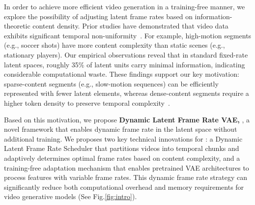 In order to achieve more efficient video generation in a training-free manner, we explore the possibility of adjusting latent frame rates based on information-theoretic content density.
Prior studies have demonstrated that video data exhibits significant temporal non-uniformity~\cite{feichtenhofer2019slowfast,yang2020temporal,li2022nuta}. For example, high-motion segments (e.g., soccer shots) have more content complexity than static scenes (e.g., stationary players). 
Our empirical observations reveal that in standard fixed-rate latent spaces, roughly 35\% of latent units carry minimal information, indicating considerable computational waste. 
These findings support our key motivation: sparse-content segments (e.g., slow-motion sequences) can be efficiently represented with fewer latent elements, whereas dense-content segments require a higher token density to preserve temporal complexity~\cite{yu2024efficient,xiang2020zooming,lin2023spvos,ravanbakhsh2024deep}.

Based on this motivation, we propose \textbf{Dynamic Latent Frame Rate VAE, \dlfr}, a novel framework that enables dynamic frame rate in the latent space without additional training. 
We proposes two key technical innovations for \dlfr: \raisebox{-1.1pt}{\ding[1.1]{182\relax}} a Dynamic Latent Frame Rate Scheduler that partitions videos into temporal chunks and adaptively determines optimal frame rates based on content complexity, and \raisebox{-1.1pt}{\ding[1.1]{183\relax}} a training-free adaptation mechanism that enables pretrained VAE architectures to process features with variable frame rates. 
This dynamic frame rate strategy can significantly reduce both computational overhead and memory requirements for video generative models (See Fig.\ref{fig:intro}).

